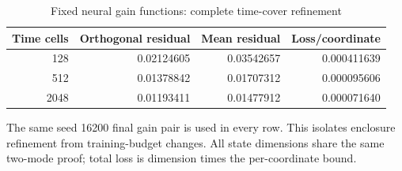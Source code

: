 \begin{table}[htbp]\centering\small
\caption{Fixed neural gain functions: complete time-cover refinement}\label{tab:suppinventoryrefine}
\begin{tabular}{rrrr}
\toprule
Time cells & Orthogonal residual & Mean residual & Loss/coordinate\\\midrule
128 & 0.02124605 & 0.03542657 & 0.000411639\\
512 & 0.01378842 & 0.01707312 & 0.000095606\\
2048 & 0.01193411 & 0.01477912 & 0.000071640\\
\bottomrule\end{tabular}
\par\smallskip\footnotesize The same seed 16200 final gain pair is used in every row. This isolates enclosure refinement from training-budget changes. All state dimensions share the same two-mode proof; total loss is dimension times the per-coordinate bound.
\end{table}

